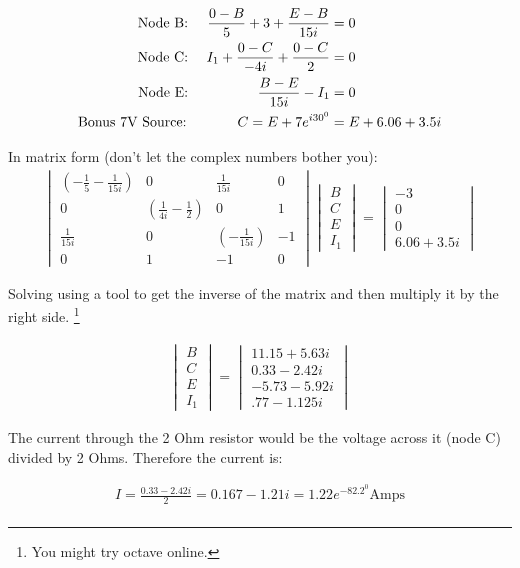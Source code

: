 \begin{align}
\text{Node B: }&&\frac{0-B}{5}+3+\frac{E-B}{15i}&=0 \notag\\
\text{Node C: }&&I_1+\frac{0-C}{-4i}+\frac{0-C}{2}&=0\notag\\
\text{Node E: }&&\frac{B-E}{15i}-I_1&=0\notag\\
\text{Bonus 7V Source: }&&C=E+7e^{i30^0}&=E+6.06+3.5i
\end{align}

In matrix form (don't let the complex numbers bother you): 
\begin{align}
\begin{vmatrix}
(-\frac{1}{5}-\frac{1}{15i})	&0	&\frac{1}{15i}	&0\\
0	&(\frac{1}{4i}-\frac{1}{2})	&0	&1\\
\frac{1}{15i}	&0	&(-\frac{1}{15i}) &-1\\
0	&1	&-1	&0
\end{vmatrix}
\begin{vmatrix}
B\\
C\\
E\\
I_1
\end{vmatrix} =
\begin{vmatrix}-3\\0\\0\\6.06+3.5i \end{vmatrix}
\end{align}

Solving using a tool to get the inverse of the matrix and then multiply it by the right side. \footnote{You might try octave online.}

\begin{align}
\begin{vmatrix}B\\C\\E\\I_1 \end{vmatrix} =
\begin{vmatrix} 11.15+5.63i\\0.33-2.42i \\-5.73-5.92i \\.77-1.125i \end{vmatrix}
\end{align}

The current through the 2 Ohm resistor would be the voltage across it (node C) divided by 2 Ohms. Therefore the current is: 

\begin{align*}
I=\frac{0.33-2.42i}{2}=0.167-1.21i=1.22e^{-82.2^0} \text{Amps}\\
\end{align*}

